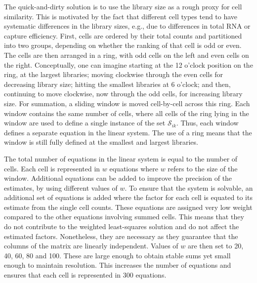 \documentclass{article}
\begin{document}
The quick-and-dirty solution is to use the library size as a rough proxy for cell similarity.
This is motivated by the fact that different cell types tend to have systematic differences in the library sizes, e.g., due to differences in total RNA or capture efficiency.
First, cells are ordered by their total counts and partitioned into two groups, depending on whether the ranking of that cell is odd or even.
The cells are then arranged in a ring, with odd cells on the left and even cells on the right.
Conceptually, one can imagine starting at the 12 o'clock position on the ring, at the largest libraries; moving clockwise through the even cells for decreasing library size;
    hitting the smallest libraries at 6 o'clock; and then, continuing to move clockwise, now through the odd cells, for increasing library size.
For summation, a sliding window is moved cell-by-cell across this ring.
Each window contains the same number of cells, where all cells of the ring lying in the window are used to define a single instance of the set $\mathcal{S}_{ik}$.
Thus, each window defines a separate equation in the linear system.
The use of a ring means that the window is still fully defined at the smallest and largest libraries.

The total number of equations in the linear system is equal to the number of cells.
Each cell is represented in $w$ equations where $w$ refers to the size of the window.
Additional equations can be added to improve the precision of the estimates, by using different values of $w$.
To ensure that the system is solvable, an additional set of equations is added where the factor for each cell is equated to its estimate from the single cell counts.
These equations are assigned very low weight compared to the other equations involving summed cells.
This means that they do not contribute to the weighted least-squares solution and do not affect the estimated factors.
Nonetheless, they are necessary as they guarantee that the columns of the matrix are linearly independent.
Values of $w$ are then set to 20, 40, 60, 80 and 100.
These are large enough to obtain stable sums yet small enough to maintain resolution.
This increases the number of equations and ensures that each cell is represented in 300 equations.
\end{document}

